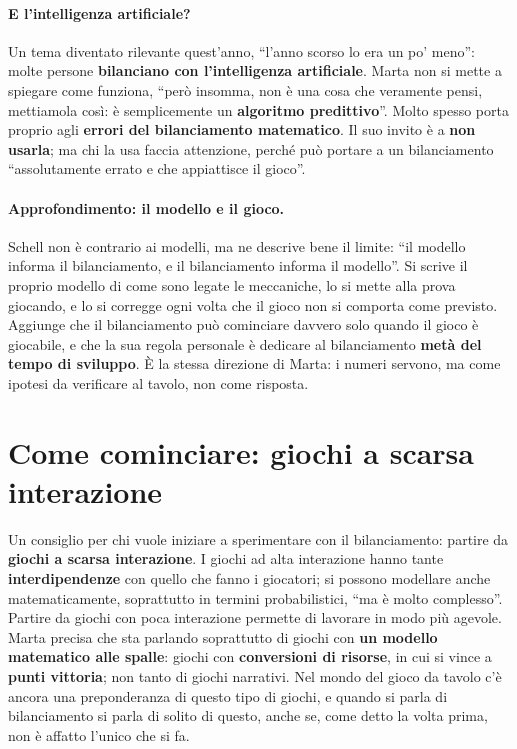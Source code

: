 \paragraph{E l'intelligenza artificiale?} Un tema diventato rilevante quest'anno, ``l'anno
scorso lo era un po' meno'': molte persone \textbf{bilanciano con l'intelligenza
artificiale}. Marta non si mette a spiegare come funziona, ``però insomma, non è una cosa che
veramente pensi, mettiamola così: è semplicemente un \textbf{algoritmo predittivo}''. Molto
spesso porta proprio agli \textbf{errori del bilanciamento matematico}. Il suo invito è a
\textbf{non usarla}; ma chi la usa faccia attenzione, perché può portare a un bilanciamento
``assolutamente errato e che appiattisce il gioco''.

\paragraph{Approfondimento: il modello e il gioco.} Schell non è contrario ai modelli, ma ne
descrive bene il limite: ``il modello informa il bilanciamento, e il bilanciamento informa il
modello''. Si scrive il proprio modello di come sono legate le meccaniche, lo si mette alla
prova giocando, e lo si corregge ogni volta che il gioco non si comporta come previsto.
Aggiunge che il bilanciamento può cominciare davvero solo quando il gioco è giocabile, e che
la sua regola personale è dedicare al bilanciamento \textbf{metà del tempo di sviluppo}. È la
stessa direzione di Marta: i numeri servono, ma come ipotesi da verificare al tavolo, non come
risposta.

\section{Come cominciare: giochi a scarsa interazione}
\label{a14:sec:cominciare}

Un consiglio per chi vuole iniziare a sperimentare con il bilanciamento: partire da
\textbf{giochi a scarsa interazione}. I giochi ad alta interazione hanno tante
\textbf{interdipendenze} con quello che fanno i giocatori; si possono modellare anche
matematicamente, soprattutto in termini probabilistici, ``ma è molto complesso''. Partire da
giochi con poca interazione permette di lavorare in modo più agevole. Marta precisa che sta
parlando soprattutto di giochi con \textbf{un modello matematico alle spalle}: giochi con
\textbf{conversioni di risorse}, in cui si vince a \textbf{punti vittoria}; non tanto di giochi
narrativi. Nel mondo del gioco da tavolo c'è ancora una preponderanza di questo tipo di giochi,
e quando si parla di bilanciamento si parla di solito di questo, anche se, come detto la volta
prima, non è affatto l'unico che si fa.

